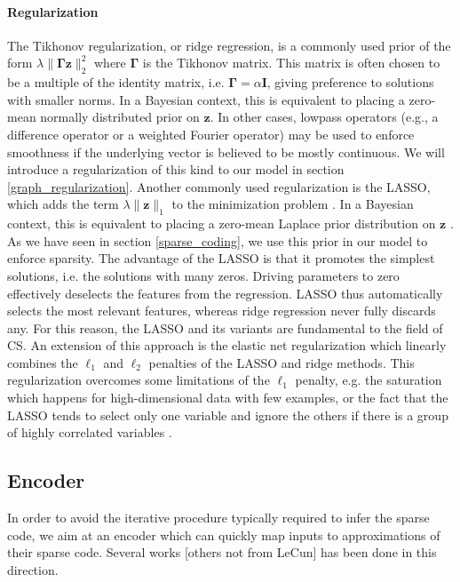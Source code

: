 \documentclass[a4paper,12pt,twoside]{report}
\newcommand{\normT}[1]{\| #1 \|_2^2}
\newcommand{\normO}[1]{\| #1 \|_1}
\newcommand{\z}{\mathbf{z}}
\begin{document}
\paragraph{Regularization}
The Tikhonov regularization, or ridge regression, is a commonly used prior of the form $\lambda \normT{\mathbf{\Gamma} \z}$ where $\mathbf{\Gamma}$ is the Tikhonov matrix. This matrix is often chosen to be a multiple of the identity matrix, i.e. $\mathbf{\Gamma} = \alpha \mathbf{I}$, giving preference to solutions with smaller norms. In a Bayesian context, this is equivalent to placing a zero-mean normally distributed prior on $\z$. In other cases, lowpass operators (e.g., a difference operator or a weighted Fourier operator) may be used to enforce smoothness if the underlying vector is believed to be mostly continuous. We will introduce a regularization of this kind to our model in section \ref{graph_regularization}.
Another commonly used regularization is the \gls{LASSO}, which adds the term $\lambda \normO{\z}$ to the minimization problem \cite{tibshirani1996Lasso}. In a Bayesian context, this is equivalent to placing a zero-mean Laplace prior distribution on $\z$ \cite{park2008BayesianLasso}. As we have seen in section \ref{sparse_coding}, we use this prior in our model to enforce sparsity. The advantage of the \gls{LASSO} is that it promotes the simplest solutions, i.e. the solutions with many zeros. Driving parameters to zero effectively deselects the features from the regression. \gls{LASSO} thus automatically selects the most relevant features, whereas ridge regression never fully discards any. For this reason, the \gls{LASSO} and its variants are fundamental to the field of \gls{CS}.
An extension of this approach is the elastic net regularization which linearly combines the $\ell_1$ and $\ell_2$ penalties of the \gls{LASSO} and ridge methods. This regularization overcomes some limitations of the $\ell_1$ penalty, e.g. the saturation which happens for high-dimensional data with few examples, or the fact that the \gls{LASSO} tends to select only one variable and ignore the others if there is a group of highly correlated variables \cite{zou2005ElasticNet}.

\subsection{Encoder}

In order to avoid the iterative procedure typically required to infer the sparse code, we aim at an encoder which can quickly map inputs to approximations of their sparse code. Several works \cite{lecun2010PSD, lecun2010LISTA, lecun2013DrSAE} {\color{red} [others not from LeCun]} has been done in this direction.
\end{document}
